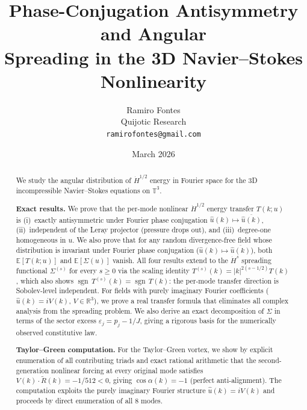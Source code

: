 \documentclass[11pt]{article}
\title{Phase-Conjugation Antisymmetry and Angular\\
Spreading in the 3D Navier--Stokes Nonlinearity}
\author{Ramiro Fontes\\
Quijotic Research\\
\texttt{ramirofontes@gmail.com}}
\date{March 2026}
\theoremstyle{definition}
\newcommand{\R}{\mathbb{R}}
\newcommand{\T}{\mathbb{T}}
\newcommand{\E}{\mathbb{E}}
\newcommand{\Hdot}[1]{\dot{H}^{#1}}
\DeclareMathOperator{\sgn}{sgn}
\begin{document}
\maketitle

\begin{abstract}
We study the angular distribution of $\Hdot{1/2}$ energy
in Fourier space for the 3D incompressible Navier--Stokes
equations on $\T^3$.

\smallskip\noindent\textbf{Exact results.}
We prove that the per-mode nonlinear $\Hdot{1/2}$ energy
transfer $T(k;u)$ is (i)~exactly antisymmetric under
Fourier phase conjugation $\hat u(k)\mapsto\overline{\hat u(k)}$,
(ii)~independent of the Leray projector (pressure drops out),
and (iii)~degree-one homogeneous in $u$.
We also prove that for any random divergence-free
field whose distribution is invariant under
Fourier phase conjugation ($\hat u(k)\mapsto
\overline{\hat u(k)}$), both $\E[T(k;u)]$ and
$\E[\Sigma(u)]$ vanish.
All four results extend to the $\Hdot{s}$ spreading
functional $\Sigma^{(s)}$ for every $s\geq 0$
via the scaling identity
$T^{(s)}(k)=|k|^{2(s-1/2)}T(k)$, which also shows
$\sgn\,T^{(s)}(k) = \sgn\,T(k)$: the per-mode transfer
direction is Sobolev-level independent.
For fields with purely imaginary Fourier coefficients
($\hat u(k) = iV(k)$, $V\in\R^3$), we prove a real
transfer formula that eliminates all complex analysis
from the spreading problem.
We also derive an exact decomposition of $\Sigma$ in
terms of the sector excess $\varepsilon_j = p_j - 1/J$,
giving a rigorous basis for the numerically observed
constitutive law.

\smallskip\noindent\textbf{Taylor--Green computation.}
For the Taylor--Green vortex, we show by explicit
enumeration of all contributing triads and exact rational
arithmetic that the second-generation nonlinear forcing
at every original mode satisfies
$V(k)\cdot\widetilde R(k)=-1/512<0$, giving
$\cos\alpha(k) = -1$ (perfect anti-alignment).  The
computation exploits the purely imaginary Fourier structure
$\hat u(k)=iV(k)$ and proceeds by direct enumeration of
all 8 modes.


\end{abstract}
\end{document}
